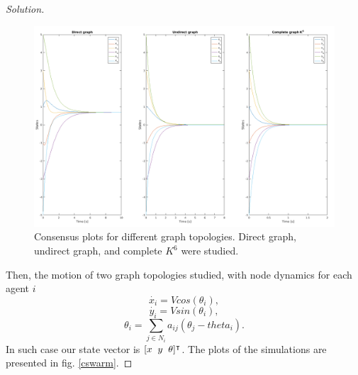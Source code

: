 \documentclass[12pt]{article}
\newenvironment{solution}{\begin{proof}[Solution]}{\end{proof}}
\begin{document}
\begin{solution}
\begin{figure}[!h]
	\includegraphics[scale=0.24]{figures/ConsensusGraphTopologies1.png}
	\centering
	\caption{Consensus plots for different graph topologies. Direct graph, undirect graph, and complete $K^6$ were studied.}
	\label{cgt1}
\end{figure}

Then, the motion of two graph topologies studied, with node dynamics for each agent $i$
\begin{equation*}
\dot{x_i}=Vcos(\theta_i),
\end{equation*}
\begin{equation*}
\dot{y_i}=Vsin(\theta_i),
\end{equation*}
\begin{equation*}
\theta_i = \sum_{j \in N_i}a_{ij}(\theta_j-theta_i).
\end{equation*}
In such case our state vector is $[x \hspace{.2cm} y \hspace{.2cm} \theta]^{\intercal}$. The plots of the simulations are presented in fig. \ref{cswarm}.


\end{solution}
\end{document}
